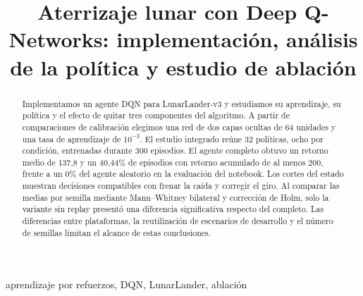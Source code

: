 \documentclass[conference]{IEEEtran}
\begin{document}
\title{Aterrizaje lunar con Deep Q-Networks: implementación, análisis de la política y estudio de ablación}
\author{
\and
{}
\and
{}
}
\maketitle

\begin{abstract}
Implementamos un agente DQN para LunarLander-v3 y estudiamos su aprendizaje, su política y el efecto de quitar tres componentes del algoritmo. A partir de comparaciones de calibración elegimos una red de dos capas ocultas de 64 unidades y una tasa de aprendizaje de $10^{-3}$. El estudio integrado reúne 32 políticas, ocho por condición, entrenadas durante 300 episodios. El agente completo obtuvo un retorno medio de 137,8 y un 40,44\% de episodios con retorno acumulado de al menos 200, frente a un 0\% del agente aleatorio en la evaluación del notebook. Los cortes del estado muestran decisiones compatibles con frenar la caída y corregir el giro. Al comparar las medias por semilla mediante Mann--Whitney bilateral y corrección de Holm, solo la variante sin replay presentó una diferencia significativa respecto del completo. Las diferencias entre plataformas, la reutilización de escenarios de desarrollo y el número de semillas limitan el alcance de estas conclusiones.
\end{abstract}

\begin{IEEEkeywords}
aprendizaje por refuerzos, DQN, LunarLander, ablación
\end{IEEEkeywords}
\end{document}
